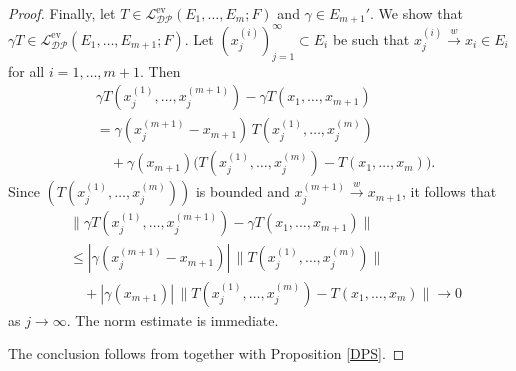 \documentclass[12 pt]{article}%
\newtheorem{final remark}[theorem]{Final Remark}
\begin{document}
\begin{proof}
Finally, let $T \in \mathcal{L_{DP}^{\mathrm{ev}}}(E_1,\dots,E_m;F)$ and $\gamma \in E_{m+1}'$. We show that $\gamma T \in \mathcal{L_{DP}^{\mathrm{ev}}}(E_1,\dots,E_{m+1};F)$. Let $(x_j^{(i)})_{j=1}^{\infty} \subset E_i$ be such that $x_j^{(i)} \overset{w}{\to} x_i \in E_i$ for all $i=1,\dots,m+1$. Then
\begin{align*}
	&\gamma T(x_j^{(1)},\dots,x_j^{(m+1)}) - \gamma T(x_1,\dots,x_{m+1}) \\
	&= \gamma(x_j^{(m+1)} - x_{m+1})\, T(x_j^{(1)},\dots,x_j^{(m)}) \\
	&\quad + \gamma(x_{m+1})\big(T(x_j^{(1)},\dots,x_j^{(m)}) - T(x_1,\dots,x_m)\big).
\end{align*}
Since $(T(x_j^{(1)},\dots,x_j^{(m)}))$ is bounded and $x_j^{(m+1)} \overset{w}{\to} x_{m+1}$, it follows that
\begin{align*}
	&\|\gamma T(x_j^{(1)},\dots,x_j^{(m+1)}) - \gamma T(x_1,\dots,x_{m+1})\| \\
	&\le |\gamma(x_j^{(m+1)} - x_{m+1})|\, \|T(x_j^{(1)},\dots,x_j^{(m)})\| \\
	&\quad + |\gamma(x_{m+1})|\, \|T(x_j^{(1)},\dots,x_j^{(m)}) - T(x_1,\dots,x_m)\| \to 0
\end{align*}
as $j \to \infty$. The norm estimate is immediate.

The conclusion follows from \cite[Remark 2.3(3) and Proposition 2.4]{RST22} together with Proposition \ref{DPS}.
	
\end{proof}
\end{document}
